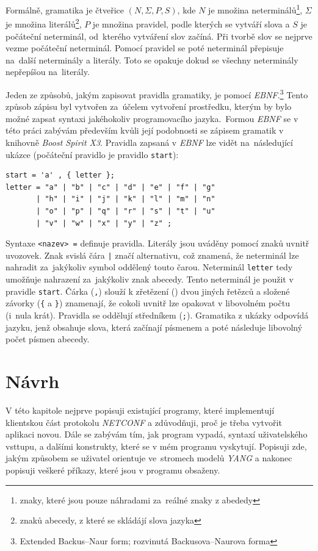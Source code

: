 \documentclass[thesis=B,czech,hidelinks]{FITthesis}[2019/03/06]
\begin{document}
Formálně, gramatika je čtveřice $(N, \Sigma, P, S)$, kde $N$ je množina neterminálů\footnote{znaky, které jsou pouze náhradami za~reálné znaky z abededy}, $\Sigma$ je množina literálů\footnote{znaků abecedy, z které se skládájí slova jazyka}, $P$ je množina pravidel, podle kterých se vytváří slova a $S$ je počáteční neterminál, od~kterého vytváření slov začíná. Při tvorbě slov se nejprve vezme počáteční neterminál. Pomocí pravidel se poté neterminál přepisuje na~další neterminály a literály. Toto se opakuje dokud se všechny neterminály nepřepíšou na~literály.

Jeden ze způsobů, jakým zapisovat pravidla gramatiky, je pomocí \textit{EBNF}.\footnote{Extended Backus--Naur form; rozvinutá Backusova--Naurova forma} Tento způsob zápisu byl vytvořen za~účelem vytvoření prostředku, kterým by bylo možné zapsat syntaxi jakéhokoliv programovacího jazyka.\,\cite{ebnf-cmu} Formou \textit{EBNF} se v této práci zabývám především kvůli její podobnosti se zápisem gramatik v knihovně \textit{Boost Spirit X3}. Pravidla zapsaná v \textit{EBNF} lze vidět na~následující ukázce (počáteční pravidlo je pravidlo \texttt{start}):
\clearpage
\begin{verbatim}
start = 'a' , { letter };
letter = "a" | "b" | "c" | "d" | "e" | "f" | "g"
       | "h" | "i" | "j" | "k" | "l" | "m" | "n"
       | "o" | "p" | "q" | "r" | "s" | "t" | "u"
       | "v" | "w" | "x" | "y" | "z" ;
\end{verbatim}
Syntaxe \verb¨<nazev> =¨ definuje pravidla. Literály jsou uváděny pomocí znaků uvnitř uvozovek. Znak svislá čára \texttt{|} značí alternativu, což znamená, že neterminál lze nahradit za~jakýkoliv symbol oddělený touto čarou. Neterminál \texttt{letter} tedy umožňuje nahrazení za~jakýkoliv znak abecedy. Tento neterminál je použit v pravidle \texttt{start}. Čárka (\texttt{,}) slouží k zřetězení () dvou jiných řetězců a složené závorky (\texttt{\{} a \texttt{\}}) znamenají, že cokoli uvnitř lze opakovat v libovolném počtu (i~nula krát). Pravidla se oddělují středníkem (\texttt{;}). Gramatika z ukázky odpovídá jazyku, jenž obsahuje slova, která začínají písmenem  a poté následuje libovolný počet písmen abecedy.



\chapter{Návrh}
V této kapitole nejprve popisuji existující programy, které implementují klientskou část protokolu \textit{NETCONF} a zdůvodňuji, proč je třeba vytvořit aplikaci novou. Dále se zabývám tím, jak program vypadá, syntaxí uživatelského vsttupu, a dalšími konstrukty, které se v mém programu vyskytují. Popisuji zde, jakým způsobem se uživatel orientuje ve~stromech modelů \textit{YANG} a nakonec popisuji veškeré příkazy, které jsou v programu obsaženy.
\end{document}
